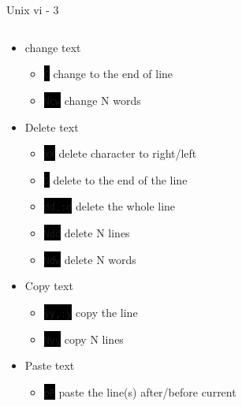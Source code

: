 \documentclass[unknownkeysallowed, 10pt, a4 paper, handout]{beamer}
\newcommand{\code}[1]{\colorbox{black}{\color{green}\texttt{#1}}}
\begin{document}
\begin{frame}[label=vim3]{Unix vi - 3}
  \begin{columns}[T]
    \begin{column}{.83\textwidth}
      \begin{itemize}
        \item change text
        \begin{itemize}
          \item \code{C} change to the end of line
          \item \code{Ncw} change N words
        \end{itemize}
        \item Delete text
        \begin{itemize}
           \item \code{xX} delete character to right/left
           \item \code{D} delete to the end of the line
           \item \code{dd,:d} delete the whole line
           \item \code{Ndd} delete N lines
           \item \code{Ndw} delete N words
        \end{itemize}
        \item Copy text
        \begin{itemize}
          \item \code{yy,:y} copy the line
          \item \code{Nyy} copy N lines
        \end{itemize}
        \item Paste text
        \begin{itemize}
          \item \code{pP} paste the line(s) after/before current
        \end{itemize}
      \end{itemize}
    \end{column}
    \hfill
    \begin{column}{.25\textwidth}

\end{column}
\end{columns}
\end{frame}
\end{document}
